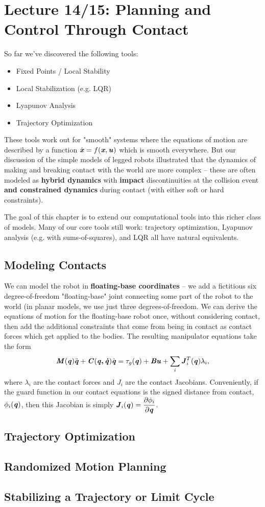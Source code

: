 \chapter{Lecture 14/15: Planning and Control Through Contact}
So far we've discovered the following tools:
\begin{itemize}
\item Fixed Points / Local Stability
\item Local Stabilization (e.g. LQR)
\item Lyapunov Analysis
\item Trajectory Optimization
\end{itemize}
These tools work out for "smooth" systems where the equations of motion are described by a function $\dot{\bm{\mathit{x}}}=f(\bm{\mathit{x}},\bm{\mathit{u}})$ which is smooth everywhere. But our discussion of the simple models of legged robots illustrated that the dynamics of making and breaking contact with the world are more complex -- these are often modeled as \textbf{hybrid dynamics} with \textbf{impact} discontinuities at the collision event \textbf{and constrained dynamics} during contact (with either soft or hard constraints).

The goal of this chapter is to extend our computational tools into this richer class of models. Many of our core tools still work: trajectory optimization, Lyapunov analysis (e.g. with sums-of-squares), and LQR all have natural equivalents. 

\section{Modeling Contacts}
We can model the robot in \textbf{floating-base coordinates} -- we add a fictitious six degree-of-freedom "floating-base" joint connecting some part of the robot to the world (in planar models, we use just three degrees-of-freedom. We can derive the equations of motion for the floating-base robot once, without considering contact, then add the additional constraints that come from being in contact as contact forces which get applied to the bodies. The resulting manipulator equations take the form
$$\bm{\mathit{M}}(\bm{\mathit{q}})\ddot{\bm{\mathit{q}}}+\bm{\mathit{C}}(\bm{\mathit{q,\dot{q}}})\dot{\bm{\mathit{q}}}=\tau_g(\bm{\mathit{q}})+\bm{\mathit{Bu}}+\sum_i\bm{\mathit{J}}_i^T(\bm{\mathit{q}})\lambda_i,$$
where $\lambda_i$ are the contact forces and $J_i$ are the contact Jacobians. 
Conveniently, if the guard function in our contact equations is the signed distance from contact, $\phi_i(\bm{\mathit{q}})$, then this Jacobian is simply $\bm{\mathit{J}}_i(\bm{\mathit{q}})=\dfrac{\partial\phi_i}{\partial\bm{\mathit{q}}}$.

\section{Trajectory Optimization}
\section{Randomized Motion Planning}
\section{Stabilizing a Trajectory or Limit Cycle}


